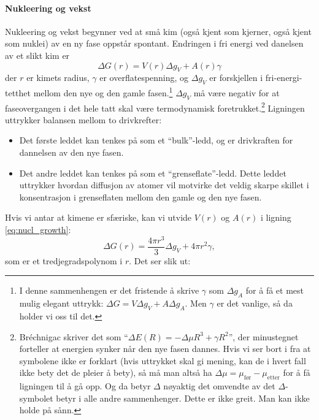 \paragraph{Nukleering og vekst}
Nukleering og vekst begynner ved at små kim (også kjent som kjerner, også kjent som nuklei) av en ny fase oppstår spontant. Endringen i fri energi ved danelsen av et slikt kim er
\begin{equation}
	\label{eq:nucl_growth}
	\Delta G(r) = V(r)\Delta g_V + A(r)\gamma
\end{equation}
der $r$ er kimets radius, $\gamma$ er overflatespenning, og $\Delta g_V$ er forskjellen i fri-energi-tetthet mellom den nye og den gamle fasen.\footnote{I denne sammenhengen er det fristende å skrive $\gamma$ som $\Delta g_A$ for å få et mest mulig elegant uttrykk: $\Delta G=V\Delta g_V + A\Delta g_A$. Men $\gamma$ er det vanlige, så da holder vi oss til det.} $\Delta g_V$ må være negativ for at faseovergangen i det hele tatt skal være termodynamisk foretrukket.\footnote{Bréchnigac skriver det som ``$\Delta E(R) = -\Delta \mu R^3 + \gamma R^2$'', der minustegnet forteller at energien synker når den nye fasen dannes. Hvis vi ser bort i fra at symbolene ikke er forklart (hvis uttrykket skal gi mening, kan de i hvert fall ikke bety det de pleier å bety), så må man altså ha $\Delta \mu = \mu_{\text{før}} - \mu_{\text{etter}}$ for å få ligningen til å gå opp. Og da betyr $\Delta$ nøyaktig det omvendte av det $\Delta$-symbolet betyr i alle andre sammenhenger. Dette er ikke greit. Man kan ikke holde på sånn.} Ligningen uttrykker balansen mellom to drivkrefter:
\begin{itemize}
	\item Det første leddet kan tenkes på som et ``bulk''-ledd, og er drivkraften for dannelsen av den nye fasen.
	\item Det andre leddet kan tenkes på som et ``grenseflate''-ledd. Dette leddet uttrykker hvordan diffusjon av atomer vil motvirke det veldig skarpe skillet i konsentrasjon i grenseflaten mellom den gamle og den nye fasen. 
\end{itemize}
\vfill
Hvis vi antar at kimene er sfæriske, kan vi utvide $V(r)$ og $A(r)$ i ligning \eqref{eq:nucl_growth}:
\begin{equation}
	\label{eq:nucl_growth_explicit}
	\Delta G(r) = \frac{4\pi r^3}{3}\Delta g_V+4\pi r^2 \gamma,
\end{equation}
som er et tredjegradspolynom i $r$. Det ser slik ut:
